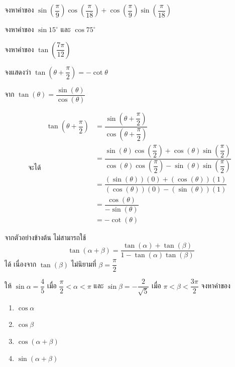 \begin{examplebox}
	จงหาค่าของ $\sin \left( \dfrac{\pi}{9} \right) \cos \left( \dfrac{\pi}{18} \right)+\cos \left( \dfrac{\pi}{9} \right) \sin \left( \dfrac{\pi}{18} \right)$
\end{examplebox}
\solution
\newpage
\begin{examplebox}
	จงหาค่าของ $\sin 15^{\circ}$ และ $\cos 75^{\circ}$
\end{examplebox}
\solution
\vspace{6cm}

\begin{examplebox}
	จงหาค่าของ $\tan \left( \dfrac{7 \pi}{12} \right)$
\end{examplebox}
\solution
\newpage

\begin{examplebox}
	จงแสดงว่า $\tan \left( \theta+\dfrac{\pi}{2} \right)=-\cot \theta$
\end{examplebox}
\proof จาก $\tan(\theta)=\dfrac{\sin(\theta)}{\cos(\theta)}$

\[
\text{จะได้ } 
\begin{aligned}
	\tan\left(\theta+\dfrac{\pi}{2}\right)
	&=
	\dfrac{\sin\left(\theta+\dfrac{\pi}{2}\right)}
	{\cos\left(\theta+\dfrac{\pi}{2}\right)}
	\\
	&=
	\dfrac{\sin(\theta)\cos\left(\dfrac{\pi}{2}\right)
		+
		\cos(\theta)\sin\left(\dfrac{\pi}{2}\right)}
	{\cos(\theta)\cos\left(\dfrac{\pi}{2}\right)
		-
		\sin(\theta)\sin\left(\dfrac{\pi}{2}\right)}
	\\
	&=
	\dfrac{(\sin(\theta))(0)+(\cos(\theta))(1)}
	{(\cos(\theta))(0)-(\sin(\theta))(1)}
	\\
	&=
	\dfrac{\cos(\theta)}{-\sin(\theta)}
	\\
	&=
	-\cot(\theta)
\end{aligned}
\]

\remark จากตัวอย่างข้างต้น ไม่สามารถใช้
\[
\tan(\alpha+\beta)
=
\dfrac{\tan(\alpha)+\tan(\beta)}
{1-\tan(\alpha)\tan(\beta)}
\]
ได้ เนื่องจาก $\tan(\beta)$ ไม่นิยามที่ $\beta=\dfrac{\pi}{2}$
\newpage

\begin{examplebox}
	ให้ $\sin \alpha = \dfrac{4}{5}$ เมื่อ $\dfrac{\pi}{2} < \alpha < \pi$ และ $\sin \beta = -\dfrac{2}{\sqrt{5}}$ เมื่อ $\pi < \beta < \dfrac{3 \pi}{2}$ จงหาค่าของ
	\begin{enumerate}
		\item $\cos \alpha$
		\item $\cos \beta$
		\item $\cos (\alpha+\beta)$
		\item $\sin (\alpha+\beta)$
	\end{enumerate}
\end{examplebox}
\solution

